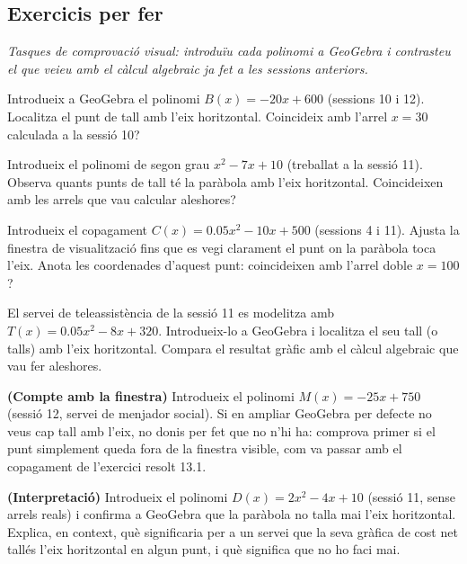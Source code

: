 \subsection{Exercicis per fer}

\noindent\textit{Tasques de comprovació visual: introduïu cada polinomi a
GeoGebra i contrasteu el que veieu amb el càlcul algebraic ja fet a les
sessions anteriors.}

\begin{exercicis}
\begin{exlist}
  \item Introdueix a GeoGebra el polinomi $B(x)=-20x+600$ (sessions 10 i
        12). Localitza el punt de tall amb l'eix horitzontal. Coincideix
        amb l'arrel $x=30$ calculada a la sessió 10?

  \item Introdueix el polinomi de segon grau $x^2-7x+10$ (treballat a la
        sessió 11). Observa quants punts de tall té la paràbola amb
        l'eix horitzontal. Coincideixen amb les arrels que vau calcular
        aleshores?

  \item Introdueix el copagament $C(x)=\num{0,05}x^2-10x+500$ (sessions 4
        i 11). Ajusta la finestra de visualització fins que es vegi
        clarament el punt on la paràbola toca l'eix. Anota les
        coordenades d'aquest punt: coincideixen amb l'arrel doble
        $x=100$?

  \item El servei de teleassistència de la sessió 11 es modelitza amb
        $T(x)=\num{0,05}x^2-8x+320$. Introdueix-lo a GeoGebra i localitza
        el seu tall (o talls) amb l'eix horitzontal. Compara el resultat
        gràfic amb el càlcul algebraic que vau fer aleshores.

  \item \textbf{(Compte amb la finestra)} Introdueix el polinomi
        $M(x)=-25x+750$ (sessió 12, servei de menjador social). Si en
        ampliar GeoGebra per defecte no veus cap tall amb l'eix, no
        donis per fet que no n'hi ha: comprova primer si el punt
        simplement queda fora de la finestra visible, com va passar amb
        el copagament de l'exercici resolt 13.1.

  \item \textbf{(Interpretació)} Introdueix el polinomi
        $D(x)=2x^2-4x+10$ (sessió 11, sense arrels reals) i confirma a
        GeoGebra que la paràbola no talla mai l'eix horitzontal. Explica,
        en context, què significaria per a un servei que la seva gràfica
        de cost net tallés l'eix horitzontal en algun punt, i
        què significa que no ho faci mai.
\end{exlist}
\end{exercicis}

